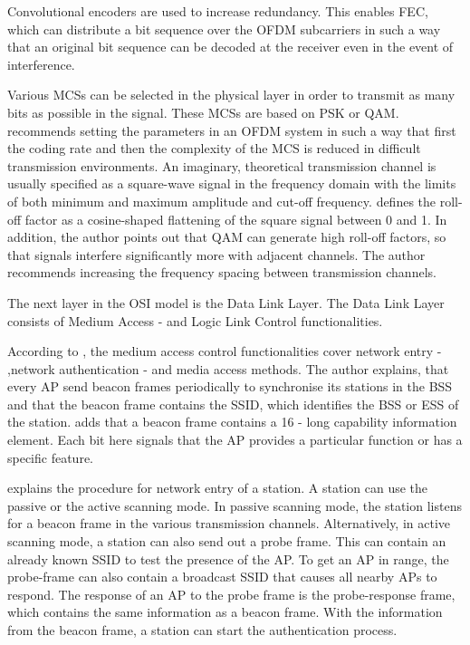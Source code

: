 \documentclass[]{nsm-thesis}
\begin{document}
Convolutional encoders are used to increase redundancy. This enables \ac{FEC}, which can distribute a bit sequence over the \ac{OFDM} subcarriers in such a way that an original bit sequence can be decoded at the receiver even in the event of interference. \textcite{kauffels_wireless_2002}


Various \ac{MCS}s can be selected in the physical layer in order to transmit as many bits as possible in the signal. 
These \ac{MCS}s are based on \ac{PSK} or \ac{QAM}. 
\textcite{kauffels_wireless_2002} recommends setting the parameters in an \ac{OFDM} system in such a way that first the coding rate and then the complexity of the \ac{MCS} is reduced in difficult transmission environments.
An imaginary, theoretical transmission channel is usually specified as a square-wave signal in the frequency domain with the limits of both minimum and maximum amplitude and cut-off frequency. \textcite{kauffels_wireless_2002} defines the roll-off factor as a cosine-shaped flattening of the square signal between 0 and 1. In addition, the author points out that \ac{QAM} can generate high roll-off factors, so that signals interfere significantly more with adjacent channels.
The author recommends increasing the frequency spacing between transmission channels.





The next layer in the OSI model is the Data Link Layer.
The Data Link Layer consists of Medium Access - and Logic Link Control functionalities.


According to \textcite{kauffels_wireless_2002}, the medium access control functionalities cover network entry - ,network authentication - and media access methods.
The author explains, that every \ac{AP} send beacon frames periodically to synchronise its stations in the \ac{BSS} and that the beacon frame contains the \ac{SSID}, which identifies the \ac{BSS} or \ac{ESS} of the station. \textcite{sauter_wireless_2022} adds that a beacon frame contains a \SI{16}{\bit} - long capability information element. Each bit here signals that the \ac{AP} provides a particular function or has a specific feature. 

\textcite{kauffels_wireless_2002} explains the procedure for network entry of a station. A station can use the passive or the active scanning mode. In passive scanning mode, the station listens for a beacon frame in the various transmission channels. Alternatively, in active scanning mode, a station can also send out a probe frame. This can contain an already known \ac{SSID} to test the presence of the \ac{AP}. To get an \ac{AP} in range, the probe-frame can also contain a broadcast SSID that causes all nearby \ac{AP}s to respond. The response of an \ac{AP} to the probe frame is the probe-response frame, which contains the same information as a beacon frame. With the information from the beacon frame, a station can start the authentication process.
 
\end{document}
